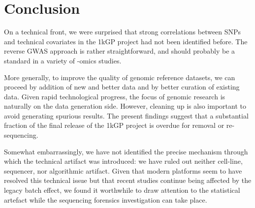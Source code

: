 \documentclass[9pt,lineno]{elife}
\begin{document}

\section{Conclusion}

On a technical front, we were surprised that strong correlations between SNPs and technical covariates in the 1kGP project had not been identified before. The reverse GWAS approach is rather straightforward, and should probably be a standard in a variety of -omics studies. 

More generally, to improve the quality of genomic reference datasets, we can proceed by addition of new and better data and by better curation of existing data. Given rapid technological progress, the focus of genomic research is naturally on the data generation side. However, cleaning up is also important to avoid generating spurious results. The present findings suggest that a substantial fraction of the final release of the 1kGP project is overdue for removal or re-sequencing. 

Somewhat embarrassingly, we have not identified the precise mechanism through which the technical artifact was introduced: we have ruled out neither cell-line, sequencer, nor algorithmic artifact. Given that modern platforms seem to have resolved this technical issue but that recent studies continue being affected by the legacy batch effect, we found it worthwhile to draw attention to the statistical artefact while the sequencing forensics investigation can take place.     


 


\end{document}

